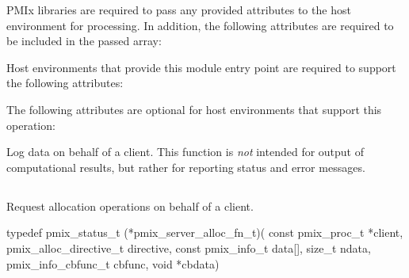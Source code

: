 \begin{arglist}
\end{arglist}


\reqattrstart
\ac{PMIx} libraries are required to pass any provided attributes to the host environment for processing. In addition, the following attributes are required to be included in the passed  array:


Host environments that provide this module entry point are required to support the following attributes:


\reqattrend

\optattrstart
The following attributes are optional for host environments that support this operation:


\optattrend

\descr

Log data on behalf of a client. This function is \textit{not} intended for output of computational results, but rather for reporting status and error messages.


\subsection{}

\summary

Request allocation operations on behalf of a client.

\format

\cspecificstart
\begin{codepar}
typedef pmix_status_t (*pmix_server_alloc_fn_t)(
                             const pmix_proc_t *client,
                             pmix_alloc_directive_t directive,
                             const pmix_info_t data[], size_t ndata,
                             pmix_info_cbfunc_t cbfunc, void *cbdata)
\end{codepar}
\cspecificend

